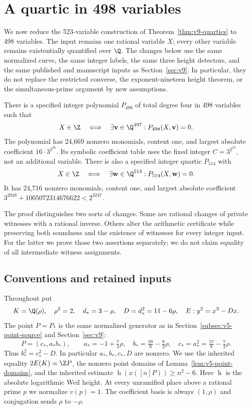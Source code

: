 \section{A quartic in 498 variables}\label{sec:v12}

We now reduce the 523-variable construction of
Theorem~\ref{thm:v9-quartics} to 498 variables.  The input remains one
rational variable $X$; every other variable remains existentially
quantified over $\Q$.  The changes below use the same normalized curve,
the same integer labels, the same three height detectors, and the same
published and manuscript inputs as Section~\ref{sec:v9}.  In particular,
they do not replace the restricted converse, the exponent-nineteen
height theorem, or the simultaneous-prime argument by new assumptions.

\begin{theorem}\label{thm:v12-quartic}
There is a specified integer polynomial $P_{498}$ of total degree four
in 498 variables such that
\[
 X\in\Z\quad\Longleftrightarrow\quad
 \exists\mathbf v\in\Q^{497}:P_{498}(X,\mathbf v)=0.
\]
The polynomial has 24,669 nonzero monomials, content one, and largest
absolute coefficient $16\cdot3^{2^{26}}$.  Its symbolic coefficient
table uses the fixed integer $C=3^{2^{25}}$, not an additional variable.
There is also a specified integer quartic $P_{514}$ with
\[
 X\in\Z\quad\Longleftrightarrow\quad
 \exists\mathbf w\in\Q^{513}:P_{514}(X,\mathbf w)=0.
\]
It has 24,716 nonzero monomials, content one, and largest absolute
coefficient $3^{2048}+1005072314676622<2^{3247}$.
\end{theorem}

The proof distinguishes two sorts of changes.  Some are rational
changes of private witnesses with a rational inverse.  Others alter
the arithmetic certificate while preserving both soundness and the
existence of witnesses for every integer input.  For the latter we
prove those two assertions separately; we do not claim equality of
all intermediate witness assignments.

\subsection{Conventions and retained inputs}\label{subsec:v12-inputs}

Throughout put
\[
 K=\Q(\rho),\quad \rho^2=2,\quad
 d_*=3-\rho,\quad D=d_*^2=11-6\rho,\quad
 E:y^2=x^3-Dx.
\]
The point $P=P_*$ is the same normalized generator as in
Section~\ref{subsec:v5-point-source} and Section~\ref{sec:v9}:
\[
 P=(c_*,a_*b_*),\qquad
 a_*=-1+\tfrac74\rho,\quad
 b_*=\tfrac{39}{8}-\tfrac92\rho,\quad
 c_*=a_*^2=\tfrac{57}{8}-\tfrac72\rho.
\]
Thus $b_*^2=c_*^2-D$.  In particular $a_*,b_*,c_*,D$ are nonzero.
We use the inherited equality $2E(K)=\Z P$, the nonzero point domains
of Lemma~\ref{lem:v5-point-domains}, and the inherited estimate
$\operatorname h(x([n]P))\ge n^2-6$.  Here $\operatorname h$ is the
absolute logarithmic Weil height.  At every unramified place above a
rational prime $p$ we normalize $v(p)=1$.  The coefficient basis is
always $(1,\rho)$ and conjugation sends $\rho$ to $-\rho$.

